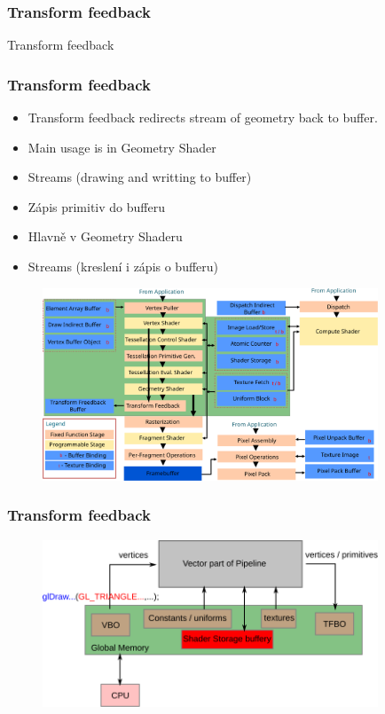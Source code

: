 \begin{frame}
\frametitle{Transform feedback}
\begin{center}
\Huge {\color{white}Transform feedback}
\end{center}
\end{frame}

\begin{frame}
\frametitle{Transform feedback}
  \scriptsize
	\begin{itemize}
	\item Transform feedback redirects stream of geometry back to buffer.
	\item Main usage is in Geometry Shader
	\item Streams (drawing and writting to buffer)
	\end{itemize}
	\begin{itemize}
	\item Zápis primitiv do bufferu
	\item Hlavně v Geometry Shaderu
	\item Streams (kreslení i zápis o bufferu)
	\end{itemize}
	\begin{figure}[h]
	\includegraphics[width=10cm,keepaspectratio]{pics/transformFeedback/tf_pipeline}
	\end{figure}
\end{frame}

\begin{frame}
\frametitle{Transform feedback}
	\begin{figure}[h]
	\includegraphics[width=10cm,keepaspectratio]{pics/transformFeedback/tf_mem}
	\end{figure}
\end{frame}

